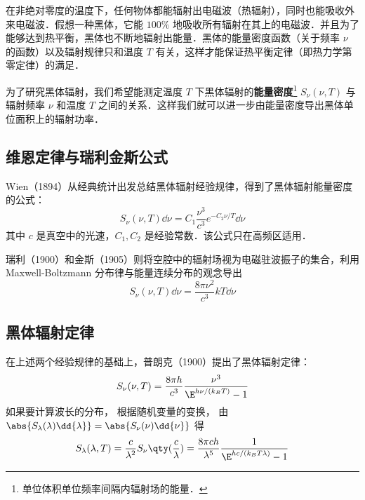 
\begin{issues}
\issueDraft
\issueNeedCite
\end{issues}

在非绝对零度的温度下，任何物体都能辐射出电磁波（热辐射），同时也能吸收外来电磁波．假想一种黑体，它能 $100\%$ 地吸收所有辐射在其上的电磁波．并且为了能够达到热平衡，黑体也不断地辐射出能量．黑体的能量密度函数（关于频率 $\nu$ 的函数）以及辐射规律只和温度 $T$ 有关，这样才能保证热平衡定律（即热力学第零定律）的满足．

为了研究黑体辐射，我们希望能测定温度 $T$ 下黑体辐射的\textbf{能量密度}\footnote{单位体积单位频率间隔内辐射场的能量．} $S_\nu(\nu,T)$ 与辐射频率 $\nu$ 和温度 $T$ 之间的关系．这样我们就可以进一步由能量密度导出黑体单位面积上的辐射功率．

\subsection{维恩定律与瑞利金斯公式}
Wien（1894）从经典统计出发总结黑体辐射经验规律，得到了黑体辐射能量密度的公式：
\begin{equation}
S_\nu(\nu,T)\dd \nu=C_1 \frac{\nu^3}{c^3}e^{-C_2\nu/T}\dd \nu
\end{equation}
其中 $c$ 是真空中的光速，$C_1,C_2$ 是经验常数．该公式只在高频区适用．

瑞利（1900）和金斯（1905）则将空腔中的辐射场视为电磁驻波振子的集合，利用 Maxwell-Boltzmann 分布律与能量连续分布的观念导出
\begin{equation}
S_\nu(\nu,T)\dd \nu=\frac{8\pi\nu^2}{c^3}kT\dd \nu
\end{equation}


\subsection{黑体辐射定律}
在上述两个经验规律的基础上，普朗克（1900）提出了黑体辐射定律：
\begin{equation}
S_\nu(\nu,T) = \frac{8\pi h}{c^3}\frac{\nu^3}{\E^{h\nu/(k_B T)} - 1}
\end{equation}
如果要计算波长的分布， 根据随机变量的变换， 由 $\abs{S_\lambda(\lambda) \dd{\lambda}} = \abs{S_\nu(\nu)\dd{\nu}}$ 得
\begin{equation}\label{BBdLaw_eq1}
S_\lambda(\lambda,T) = \frac{c}{\lambda^2}S_\nu\qty(\frac{c}{\lambda}) =
\frac{8\pi ch}{\lambda^5} \frac{1}{\E^{hc/(k_B T\lambda)} - 1}
\end{equation}

